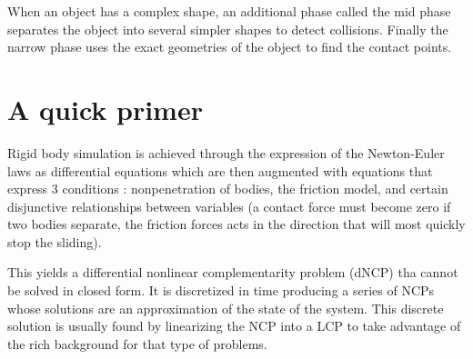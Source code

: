 When an object has a complex shape, an additional phase called the mid phase separates the object into several simpler shapes to detect collisions. Finally the narrow phase uses the exact geometries of the object to find the contact points.

\section{A quick primer}
Rigid body simulation is achieved through the expression of the Newton-Euler laws as differential equations which are then augmented with equations that express 3 conditions : nonpenetration of bodies, the friction model, and certain disjunctive relationships between variables (a contact force must become zero if two bodies separate, the friction forces acts in the direction that will most quickly stop the sliding).

This yields a differential nonlinear complementarity problem (dNCP) tha cannot be solved in closed form. It is discretized in time producing a series of NCPs whose solutions are an approximation of the state of the system.  This discrete solution is usually found by linearizing the NCP into a LCP to take advantage of the rich background for that type of problems.

